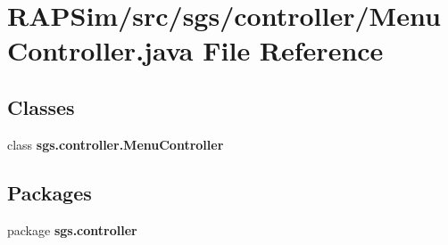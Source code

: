 \section{R\-A\-P\-Sim/src/sgs/controller/\-Menu\-Controller.java File Reference}
\label{_menu_controller_8java}
\subsection*{Classes}
\begin{DoxyCompactItemize}
\item 
class {\bf sgs.\-controller.\-Menu\-Controller}
\end{DoxyCompactItemize}
\subsection*{Packages}
\begin{DoxyCompactItemize}
\item 
package {\bf sgs.\-controller}
\end{DoxyCompactItemize}
